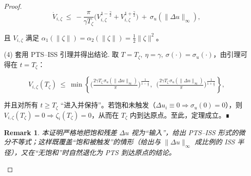 \documentclass[pdflatex,sn-mathphys-num]{sn-jnl}%
\theoremstyle{thmstyleone}%
\newtheorem{theorem}{Theorem}%
\theoremstyle{thmstyletwo}%
\newtheorem{remark}{Remark}%
\theoremstyle{thmstylethree}%
\begin{document}
\begin{proof}
	$$
	\dot V_{i,\zeta}
	\ \le\
	-\frac{\pi}{\gamma T_\zeta}\Big(V_{i,\zeta}^{1-\frac{\gamma}{2}}+V_{i,\zeta}^{1+\frac{\gamma}{2}}\Big)
	\ +\ \sigma_u(\|\Delta u\|_\infty),
	$$
	
	且 $V_{i,\zeta}$ 满足 $\alpha_1(\|\zeta\|)=\alpha_2(\|\zeta\|)=\tfrac12\|\zeta\|^2$。
	
	(4) 套用 PTS–ISS 引理并得出结论.
	取 $T=T_\zeta,\ \eta=\gamma,\ \sigma(\cdot)=\sigma_u(\cdot)$，由引理可得在 $t=T_\zeta$：
	
	$$
	V_{i,\zeta}(T_\zeta)\ \le\
	\min\!\left\{
	\Big(\tfrac{2\gamma T_\zeta\,\sigma_u(\|\Delta u\|_\infty)}{\pi}\Big)^{\!\frac{1}{1-\frac{\gamma}{2}}},
	\ \ 
	\Big(\tfrac{2\gamma T_\zeta\,\sigma_u(\|\Delta u\|_\infty)}{\pi}\Big)^{\!\frac{1}{1+\frac{\gamma}{2}}}
	\right\},
	$$
	
	并且对所有 $t\ge T_\zeta$ “进入并保持”。若饱和未触发（$\Delta u_i\equiv0\Rightarrow \sigma_u(0)=0$），则 $V_{i,\zeta}(T_\zeta)=0\Rightarrow \zeta_i(T_\zeta)=0$，从而在 $T_\zeta$ 内到达原点。至此，定理成立。∎
	
	\begin{remark}
	本证明严格地把饱和残差 $\Delta u$ 视为“输入”，给出 PTS–ISS 形式的微分不等式；这样既覆盖“饱和被触发”的情形（给出与 $\|\Delta u\|_\infty$ 成比例的 ISS 半径），又在“无饱和”时自然退化为 PTS 到达原点的结论。
	\end{remark}
	
	\end{proof}
	
\end{document}
